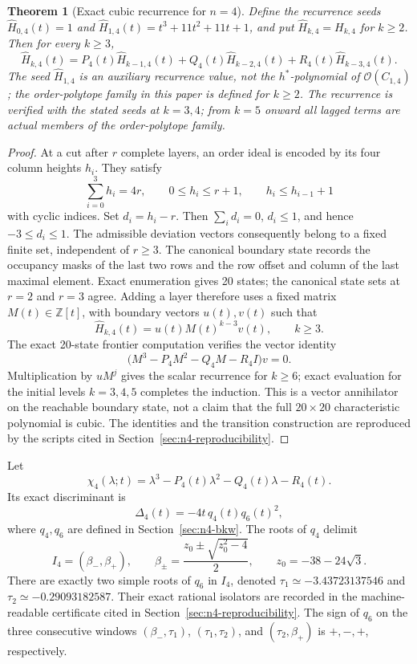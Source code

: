 \documentclass[11pt,a4paper]{article}
\newtheorem{theorem}{Theorem}[section]
\theoremstyle{definition}
\begin{document}
\begin{theorem}[Exact cubic recurrence for $n=4$]
\label{thm:n4-transfer}
Define the recurrence seeds $\widehat H_{0,4}(t)=1$ and
$\widehat H_{1,4}(t)=t^3+11t^2+11t+1$, and put
$\widehat H_{k,4}=H_{k,4}$ for $k\ge2$. Then for every $k\ge3$,
\[
\widehat H_{k,4}(t)=P_4(t)\widehat H_{k-1,4}(t)
+Q_4(t)\widehat H_{k-2,4}(t)+R_4(t)\widehat H_{k-3,4}(t).
\]
The seed $\widehat H_{1,4}$ is an auxiliary recurrence value, not the
$h^*$-polynomial of $\mathcal O(C_{1,4})$; the order-polytope family in
this paper is defined for $k\ge2$. The recurrence is verified with the
stated seeds at $k=3,4$; from $k=5$ onward all lagged terms are actual
members of the order-polytope family.
\end{theorem}

\begin{proof}
At a cut after $r$ complete layers, an order ideal is encoded by its
four column heights $h_i$. They satisfy
\[
\sum_{i=0}^3h_i=4r,\qquad 0\le h_i\le r+1,\qquad
h_i\le h_{i-1}+1
\]
with cyclic indices. Set $d_i=h_i-r$. Then
$\sum_i d_i=0$, $d_i\le1$, and hence $-3\le d_i\le1$.
The admissible deviation vectors consequently belong to a fixed finite
set, independent of $r\ge3$. The canonical boundary state records the
occupancy masks of the last two rows and the row offset and column of
the last maximal element. Exact enumeration gives 20 states; the
canonical state sets at $r=2$ and $r=3$ agree. Adding a layer therefore
uses a fixed matrix $M(t)\in\mathbb Z[t]$, with boundary vectors
$u(t),v(t)$ such that
\[
\widehat H_{k,4}(t)=u(t)M(t)^{k-3}v(t),\qquad k\ge3.
\]
The exact 20-state frontier computation verifies the vector identity
\[
\bigl(M^3-P_4M^2-Q_4M-R_4I\bigr)v=0.
\]
Multiplication by $uM^j$ gives the scalar recurrence for $k\ge6$;
exact evaluation for the initial levels $k=3,4,5$ completes the
induction. This is a vector annihilator on the reachable boundary state,
not a claim that the full $20\times20$ characteristic polynomial is
cubic. The identities and the transition construction are reproduced
by the scripts cited in Section~\ref{sec:n4-reproducibility}.
\end{proof}

Let
\[
\chi_4(\lambda;t)=\lambda^3-P_4(t)\lambda^2-Q_4(t)\lambda-R_4(t).
\]
Its exact discriminant is
\[
\Delta_4(t)=-4t\,q_4(t)q_6(t)^2,
\]
where $q_4,q_6$ are defined in Section~\ref{sec:n4-bkw}. The roots of
$q_4$ delimit
\[
I_4=(\beta_-,\beta_+),\qquad
\beta_\pm=\frac{z_0\pm\sqrt{z_0^2-4}}2,\qquad
z_0=-38-24\sqrt3.
\]
There are exactly two simple roots of $q_6$ in $I_4$, denoted
$\tau_1\simeq-3.43723137546$ and
$\tau_2\simeq-0.29093182587$. Their exact rational isolators are
recorded in the machine-readable certificate cited in
Section~\ref{sec:n4-reproducibility}.
The sign of $q_6$ on the three consecutive windows
$(\beta_-,\tau_1)$, $(\tau_1,\tau_2)$, and $(\tau_2,\beta_+)$ is
$+,-,+$, respectively.
\end{document}
